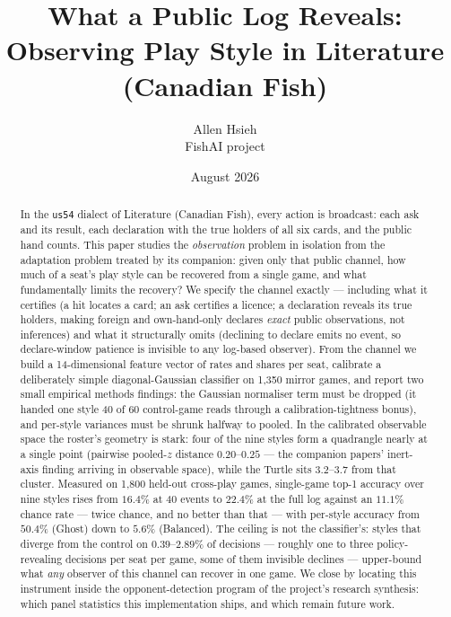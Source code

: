\documentclass[11pt]{article}
\title{\textbf{What a Public Log Reveals:\\ Observing Play Style in Literature (Canadian Fish)}}
\author{Allen Hsieh\\[2pt] {\small FishAI project}}
\date{August 2026}
\newcommand{\code}[1]{\texttt{#1}}
\newcommand{\usff}{\code{us54}}
\begin{document}
\maketitle

\begin{abstract}
\noindent
In the \usff{} dialect of Literature (Canadian Fish), every action is broadcast: each ask and
its result, each declaration with the true holders of all six cards, and the public hand
counts. This paper studies the \emph{observation} problem in isolation from the adaptation
problem treated by its companion: given only that public channel, how much of a seat's play
style can be recovered from a single game, and what fundamentally limits the recovery? We
specify the channel exactly --- including what it certifies (a hit locates a card; an ask
certifies a licence; a declaration reveals its true holders, making foreign and own-hand-only
declares \emph{exact} public observations, not inferences) and what it structurally omits
(declining to declare emits no event, so declare-window patience is invisible to any log-based
observer). From the channel we build a 14-dimensional feature vector of rates and shares per
seat, calibrate a deliberately simple diagonal-Gaussian classifier on 1{,}350 mirror games,
and report two small empirical methods findings: the Gaussian normaliser term must be dropped
(it handed one style 40 of 60 control-game reads through a calibration-tightness bonus), and
per-style variances must be shrunk halfway to pooled. In the calibrated observable space the
roster's geometry is stark: four of the nine styles form a quadrangle nearly at a single point
(pairwise pooled-$z$ distance $0.20$--$0.25$ --- the companion papers' inert-axis finding
arriving in observable space), while the Turtle sits $3.2$--$3.7$ from that cluster.
Measured on 1{,}800 held-out cross-play games, single-game top-1 accuracy over nine styles
rises from $16.4\%$ at 40 events to $22.4\%$ at the full log against an $11.1\%$ chance rate
--- twice chance, and no better than that --- with per-style accuracy from $50.4\%$ (Ghost)
down to $5.6\%$ (Balanced). The ceiling is not the classifier's: styles that diverge from the
control on $0.39$--$2.89\%$ of decisions --- roughly one to three policy-revealing decisions
per seat per game, some of them invisible declines --- upper-bound what \emph{any} observer of
this channel can recover in one game. We close by locating this instrument inside the
opponent-detection program of the project's research synthesis: which panel statistics this
implementation ships, and which remain future work.
\end{abstract}
\end{document}
